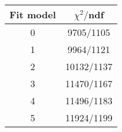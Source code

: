 \begin{tabular}{c|c}
Fit model & $\chi^2/$ndf \\
\hline
0 & 9705/1105\\
1 & 9964/1121\\
2 & 10132/1137\\
3 & 11470/1167\\
4 & 11496/1183\\
5 & 11924/1199\\
\end{tabular}
